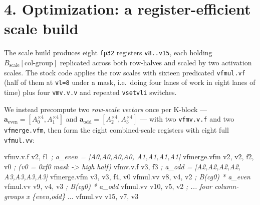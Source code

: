 \documentclass[
]{article}
\newenvironment{Shaded}{}{}
\newcommand{\CommentTok}[1]{\textcolor[rgb]{0.38,0.63,0.69}{\textit{#1}}}
\newcommand{\NormalTok}[1]{#1}
\newcommand{\OperatorTok}[1]{\textcolor[rgb]{0.40,0.40,0.40}{#1}}
\begin{document}
\section{4. Optimization: a register-efficient scale
build}\label{optimization-a-register-efficient-scale-build}

The scale build produces eight \texttt{fp32} registers \texttt{v8..v15},
each holding \(B_{\text{scale}}[\text{col-group}]\) replicated across
both row-halves and scaled by two activation scales. The stock code
applies the row scales with sixteen predicated \texttt{vfmul.vf} (half
of them at \texttt{vl=8} under a mask, i.e.~doing four lanes of work in
eight lanes of time) plus four \texttt{vmv.v.v} and repeated
\texttt{vsetvli} switches.

We instead precompute two \emph{row-scale vectors} once per K-block ---
\(\mathbf{a}_{\text{even}}=[A_0^{\times4}, A_1^{\times4}]\) and
\(\mathbf{a}_{\text{odd}}=[A_2^{\times4}, A_3^{\times4}]\) --- with two
\texttt{vfmv.v.f} and two \texttt{vfmerge.vfm}, then form the eight
combined-scale registers with eight full \texttt{vfmul.vv}:

\begin{Shaded}
\begin{Highlighting}[]
\NormalTok{    vfmv}\OperatorTok{.}\NormalTok{v}\OperatorTok{.}\NormalTok{f     v2}\OperatorTok{,}\NormalTok{ f1            }\CommentTok{; a\_even = [A0,A0,A0,A0, A1,A1,A1,A1]}
\NormalTok{    vfmerge}\OperatorTok{.}\NormalTok{vfm  v2}\OperatorTok{,}\NormalTok{ v2}\OperatorTok{,}\NormalTok{ f2}\OperatorTok{,}\NormalTok{ v0    }\CommentTok{;   (v0 = 0xf0 mask {-}\textgreater{} high half)}
\NormalTok{    vfmv}\OperatorTok{.}\NormalTok{v}\OperatorTok{.}\NormalTok{f     v3}\OperatorTok{,}\NormalTok{ f3            }\CommentTok{; a\_odd  = [A2,A2,A2,A2, A3,A3,A3,A3]}
\NormalTok{    vfmerge}\OperatorTok{.}\NormalTok{vfm  v3}\OperatorTok{,}\NormalTok{ v3}\OperatorTok{,}\NormalTok{ f4}\OperatorTok{,}\NormalTok{ v0}
\NormalTok{    vfmul}\OperatorTok{.}\NormalTok{vv     v8}\OperatorTok{,}\NormalTok{  v4}\OperatorTok{,}\NormalTok{ v2       }\CommentTok{; B(cg0) * a\_even}
\NormalTok{    vfmul}\OperatorTok{.}\NormalTok{vv     v9}\OperatorTok{,}\NormalTok{  v4}\OperatorTok{,}\NormalTok{ v3       }\CommentTok{; B(cg0) * a\_odd}
\NormalTok{    vfmul}\OperatorTok{.}\NormalTok{vv     v10}\OperatorTok{,}\NormalTok{ v5}\OperatorTok{,}\NormalTok{ v2       }\CommentTok{; ... four column{-}groups x \{even,odd\}}
\NormalTok{    ...}
\NormalTok{    vfmul}\OperatorTok{.}\NormalTok{vv     v15}\OperatorTok{,}\NormalTok{ v7}\OperatorTok{,}\NormalTok{ v3}
\end{Highlighting}
\end{Shaded}
\end{document}
